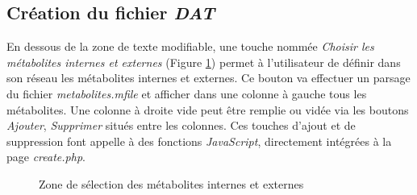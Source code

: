 \subsection{Création du fichier \emph{DAT}}

En dessous de la zone de texte modifiable, une touche nommée \emph{Choisir les métabolites internes et externes} (Figure \ref{boutonMET_int_EXT}) permet à l'utilisateur de définir dans son réseau les métabolites internes et externes. Ce bouton va effectuer un parsage du fichier \emph{metabolites.mfile} et afficher dans une colonne à gauche tous les métabolites. Une colonne à droite vide peut être remplie ou vidée via les boutons \emph{Ajouter}, \emph{Supprimer} situés entre les colonnes.
Ces touches d'ajout et de suppression font appelle à des fonctions \emph{JavaScript}, directement intégrées à la page \emph{create.php}.\\

\begin{figure}[!ht]
    \begin{center}
        \caption{Zone de sélection des métabolites internes et externes}
          \label{boutonMET_int_EXT}
      \end{center}   
\end{figure}


